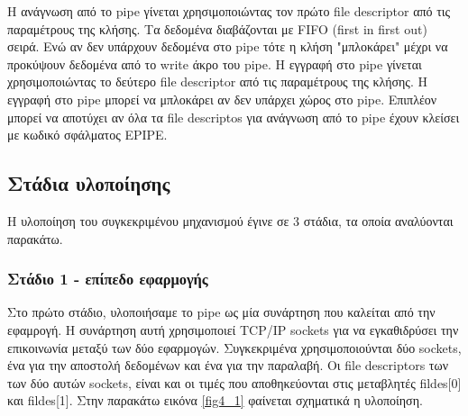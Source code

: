 Η ανάγνωση από το pipe γίνεται χρησιμοποιώντας τον πρώτο file descriptor από τις
παραμέτρους της κλήσης. Τα δεδομένα διαβάζονται με FIFO (first in first out)
σειρά. Ενώ αν δεν υπάρχουν δεδομένα στο pipe τότε η κλήση "μπλοκάρει" μέχρι να
προκύψουν δεδομένα από το write άκρο του pipe. Η εγγραφή στο pipe γίνεται
χρησιμοποιώντας το δεύτερο file descriptor από τις παραμέτρους της κλήσης. Η
εγγραφή στο pipe μπορεί να μπλοκάρει αν δεν υπάρχει χώρος στο pipe. Επιπλέον
μπορεί να αποτύχει αν όλα τα file descriptos για ανάγνωση από το pipe έχουν
κλείσει με κωδικό σφάλματος EPIPE. 

\subsection{Στάδια υλοποίησης}

Η υλοποίηση του συγκεκριμένου μηχανισμού έγινε σε 3 στάδια, τα οποία αναλύονται
παρακάτω. 

\subsubsection{Στάδιο 1 - επίπεδο εφαρμογής}


Στο πρώτο στάδιο, υλοποιήσαμε το pipe ως μία συνάρτηση που καλείται από την
εφαμρογή. Η συνάρτηση αυτή χρησιμοποιεί TCP/IP sockets για να εγκαθιδρύσει την
επικοινωνία μεταξύ των δύο εφαρμογών. Συγκεκριμένα χρησιμοποιούνται δύο sockets,
ένα για την αποστολή δεδομένων και ένα για την παραλαβή. Οι file descriptors των
των δύο αυτών sockets, είναι και οι τιμές που αποθηκεύονται στις μεταβλητές
fildes[0] και fildes[1]. Στην παρακάτω εικόνα \ref{fig4_1} φαίνεται σχηματικά η
υλοποίηση.

